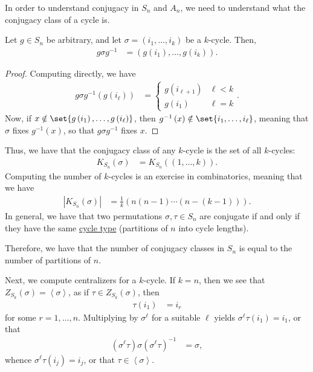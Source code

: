 \documentclass[10pt]{mypackage}
\begin{document}
In order to understand conjugacy in $S_n$ and $A_n$, we need to understand what the conjugacy class of a cycle is.
\begin{proposition}
  Let $g\in S_n$ be arbitrary, and let $\sigma = \left( i_1,\dots,i_k \right)$ be a $k$-cycle. Then,
  \begin{align*}
    g\sigma g^{-1} &= \left( g\left( i_1 \right),\dots,g\left( i_k \right) \right).
  \end{align*}
\end{proposition}
\begin{proof}
  Computing directly, we have
  \begin{align*}
    g\sigma g^{-1}\left( g\left( i_{\ell} \right) \right) &= \begin{cases}
      g\left( i_{\ell + 1} \right) & \ell < k\\
      g\left( i_1 \right) & \ell = k
    \end{cases}.
  \end{align*}
  Now, if $x\notin \set{g\left( i_1 \right),\dots,g\left( i_{\ell} \right)}$, then $g^{-1}\left( x \right)\notin \set{i_1,\dots,i_{\ell}}$, meaning that $\sigma$ fixes $g^{-1}(x)$, so that $g\sigma g^{-1}$ fixes $x$. 
\end{proof}
Thus, we have that the conjugacy class of any $k$-cycle is the set of all $k$-cycles:
\begin{align*}
  K_{S_n}\left( \sigma \right) &= K_{S_n} \left( \left( 1,\dots,k \right) \right).
\end{align*}
Computing the number of $k$-cycles is an exercise in combinatorics, meaning that we have
\begin{align*}
  \left\vert K_{S_n}\left( \sigma \right) \right\vert &= \frac{1}{k}\left( n\left( n-1 \right)\cdots \left( n-\left( k-1 \right) \right) \right).
\end{align*}
In general, we have that two permutations $\sigma,\tau\in S_n$ are conjugate if and only if they have the same \href{https://groupprops.subwiki.org/wiki/Cycle_type_of_a_permutation}{cycle type} (partitions of $n$ into cycle lengths).%

Therefore, we have that the number of conjugacy classes in $S_n$ is equal to the number of partitions of $n$.%

Next, we compute centralizers for a $k$-cycle. If $k = n$, then we see that $Z_{S_k}\left( \sigma \right) = \left\langle \sigma \right\rangle$, as if $\tau\in Z_{S_k}\left( \sigma \right)$, then
\begin{align*}
  \tau\left( i_1 \right) &= i_r
\end{align*}
for some $r=1,\dots,n$. Multiplying by $\sigma^{\ell}$ for a suitable $\ell$ yields $\sigma^{\ell}\tau\left( i_1 \right) = i_1$, or that
\begin{align*}
  \left( \sigma^{\ell}\tau \right)\sigma \left( \sigma^{\ell}\tau \right)^{-1} &= \sigma,
\end{align*}
whence $\sigma^{\ell}\tau\left( i_j \right) = i_j$, or that $\tau\in \left\langle \sigma \right\rangle$.%
\end{document}
